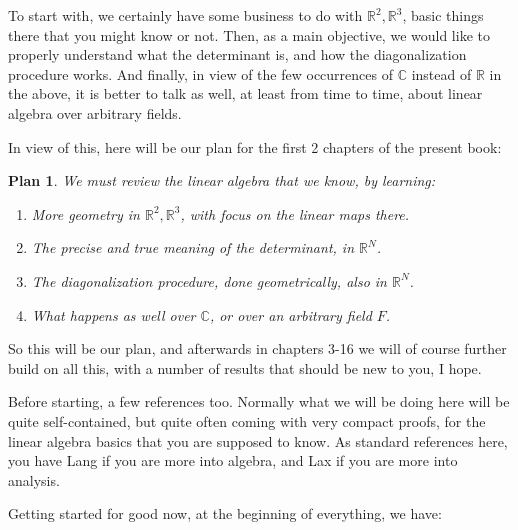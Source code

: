 \documentclass[12pt]{amsbook}
\newtheorem{plan}[theorem]{Plan}
\begin{document}
\bigskip

To start with, we certainly have some business to do with $\mathbb R^2,\mathbb R^3$, basic things there that you might know or not. Then, as a main objective, we would like to properly understand what the determinant is, and how the diagonalization procedure works. And finally, in view of the few occurrences of $\mathbb C$ instead of $\mathbb R$ in the above, it is better to talk as well, at least from time to time, about linear algebra over arbitrary fields.

\bigskip

In view of this, here will be our plan for the first 2 chapters of the present book:

\begin{plan}
We must review the linear algebra that we know, by learning:
\begin{enumerate}
\item More geometry in $\mathbb R^2,\mathbb R^3$, with focus on the linear maps there.

\item The precise and true meaning of the determinant, in $\mathbb R^N$.

\item The diagonalization procedure, done geometrically, also in $\mathbb R^N$.

\item What happens as well over $\mathbb C$, or over an arbitrary field $F$.
\end{enumerate}
\end{plan}

So this will be our plan, and afterwards in chapters 3-16 we will of course further build on all this, with a number of results that should be new to you, I hope.

\bigskip

Before starting, a few references too. Normally what we will be doing here will be quite self-contained, but quite often coming with very compact proofs, for the linear algebra basics that you are supposed to know. As standard references here, you have Lang \cite{la1} if you are more into algebra, and Lax \cite{lx1} if you are more into analysis.

\bigskip

Getting started for good now, at the beginning of everything, we have:
\end{document}
